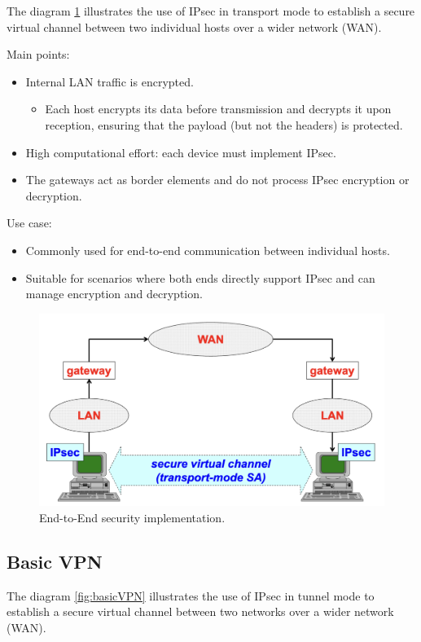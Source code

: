 The diagram \ref{fig:EESec} illustrates the use of IPsec in transport mode to establish a secure virtual channel between two individual hosts over a wider network (WAN).

Main points:
\begin{itemize}
    \item Internal LAN traffic is encrypted.
    \begin{itemize}
        \item Each host encrypts its data before transmission and decrypts it upon reception, ensuring that the payload (but not the headers) is protected.
    \end{itemize}
    \item High computational effort: each device must implement IPsec.
    \item The gateways act as border elements and do not process IPsec encryption or decryption.
\end{itemize}

Use case:
\begin{itemize}
    \item Commonly used for end-to-end communication between individual hosts.
    \item Suitable for scenarios where both ends directly support IPsec and can manage encryption and decryption.
\end{itemize}
\begin{figure}[H]
  \includegraphics[width=\linewidth]{Images/NetSec/end_to_end_security.png}
  \caption{End-to-End security implementation.}
  \label{fig:EESec}
\end{figure}

\subsection{Basic VPN}
The diagram \ref{fig:basicVPN} illustrates the use of IPsec in tunnel mode to establish a secure virtual channel between two networks over a wider network (WAN).

